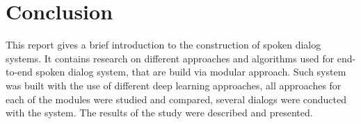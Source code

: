 \documentclass[12pt,titlepage,a4paper]{article}
\begin{document}
\pagebreak

\section{Conclusion}
This report gives a brief introduction to the construction of spoken dialog systems. It contains research on different approaches and algorithms used for end-to-end spoken dialog system, that are build via modular approach. Such system was built with the use of different deep learning approaches, all approaches for each of the modules were studied and compared, several dialogs were conducted with the system. The results of the study were described and presented.

\pagebreak



 

\end{document}
